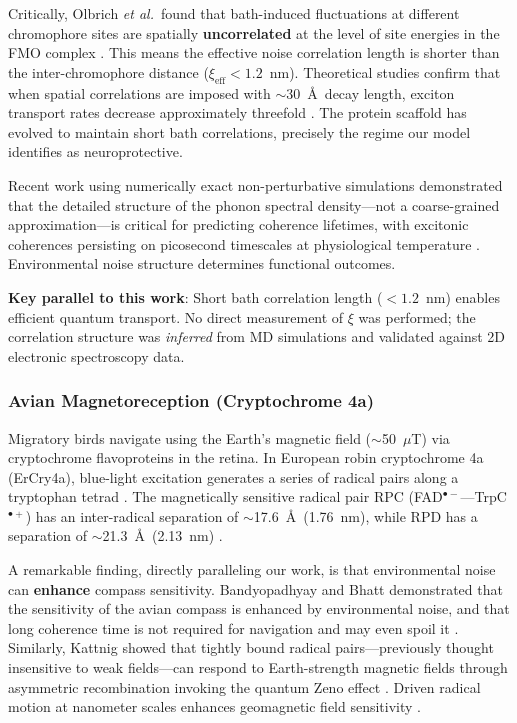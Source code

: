 \documentclass[11pt]{article}
\begin{document}
Critically, Olbrich \textit{et al.}\ found that bath-induced fluctuations at different chromophore sites 
are spatially \textbf{uncorrelated} at the level of site energies in the FMO complex 
\cite{Olbrich2011}. This means the effective noise correlation length is shorter than the inter-chromophore 
distance ($\xi_\text{eff} < 1.2$~nm). Theoretical studies confirm that when spatial correlations are 
imposed with $\sim$30~\AA\ decay length, exciton transport rates decrease approximately threefold 
\cite{Abramavicius2011}. The protein scaffold has evolved to maintain short bath correlations, 
precisely the regime our model identifies as neuroprotective.

Recent work using numerically exact non-perturbative simulations demonstrated that the detailed 
structure of the phonon spectral density---not a coarse-grained approximation---is critical for 
predicting coherence lifetimes, with excitonic coherences persisting on picosecond timescales at 
physiological temperature \cite{Kim2025}. Environmental noise structure determines functional 
outcomes.

\textbf{Key parallel to this work}: Short bath correlation length ($< 1.2$~nm) enables efficient 
quantum transport. No direct measurement of $\xi$ was performed; the correlation structure was 
\textit{inferred} from MD simulations and validated against 2D electronic spectroscopy data.

\subsubsection{Avian Magnetoreception (Cryptochrome 4a)}

Migratory birds navigate using the Earth's magnetic field ($\sim$50~$\mu$T) via cryptochrome 
flavoproteins in the retina. In European robin cryptochrome 4a (ErCry4a), blue-light excitation 
generates a series of radical pairs along a tryptophan tetrad \cite{Xu2021,Wong2021}. The 
magnetically sensitive radical pair RPC (FAD$^{\bullet-}$---TrpC$^{\bullet+}$) has an inter-radical 
separation of $\sim$17.6~\AA\ (1.76~nm), while RPD has a separation of $\sim$21.3~\AA\ (2.13~nm) 
\cite{Deviers2025}.

A remarkable finding, directly paralleling our work, is that environmental noise can \textbf{enhance} 
compass sensitivity. Bandyopadhyay and Bhatt demonstrated that the sensitivity of the avian compass is 
enhanced by environmental noise, and that long coherence time is not required for navigation and may 
even spoil it \cite{Bandyopadhyay2012}. Similarly, Kattnig showed that tightly bound radical 
pairs---previously thought insensitive to weak fields---can respond to Earth-strength magnetic fields 
through asymmetric recombination invoking the quantum Zeno effect \cite{Kattnig2024}. Driven radical 
motion at nanometer scales enhances geomagnetic field sensitivity \cite{Babcock2020}.
\end{document}
